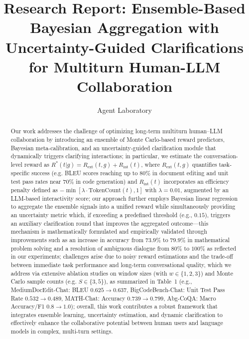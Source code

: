\documentclass{article} %
\title{Research Report: Ensemble-Based Bayesian Aggregation with Uncertainty-Guided Clarifications for Multiturn Human-LLM Collaboration}
\author{Agent Laboratory}
\date{}
\begin{document}
\maketitle

\begin{abstract}
Our work addresses the challenge of optimizing long-term multiturn human–LLM collaboration by introducing an ensemble of Monte Carlo-based reward predictors, Bayesian meta-calibration, and an uncertainty-guided clarification module that dynamically triggers clarifying interactions; in particular, we estimate the conversation-level reward as \(R^*(t|g) = R_{\text{ext}}(t,g) + R_{\text{int}}(t)\), where \(R_{\text{ext}}(t,g)\) quantifies task-specific success (e.g. BLEU scores reaching up to \(80\%\) in document editing and unit test pass rates near \(70\%\) in code generation) and \(R_{\text{int}}(t)\) incorporates an efficiency penalty defined as \(-\min[\lambda \cdot \text{TokenCount}(t), 1]\) with \(\lambda=0.01\), augmented by an LLM-based interactivity score; our approach further employs Bayesian linear regression to aggregate the ensemble signals into a unified reward while simultaneously providing an uncertainty metric which, if exceeding a predefined threshold (e.g., \(0.15\)), triggers an auxiliary clarification round that improves the aggregated outcome—this mechanism is mathematically formulated and empirically validated through improvements such as an increase in accuracy from \(73.9\%\) to \(79.9\%\) in mathematical problem solving and a resolution of ambiguous dialogue from \(80\%\) to \(100\%\) as reflected in our experiments; challenges arise due to noisy reward estimations and the trade-off between immediate task performance and long-term conversational quality, which we address via extensive ablation studies on window sizes (with \(w \in \{1,2,3\}\)) and Monte Carlo sample counts (e.g. \(S \in \{3,5\}\)), as summarized in Table~1 (e.g., MediumDocEdit-Chat: BLEU \(0.625 \rightarrow 0.637\), BigCodeBench-Chat: Unit Test Pass Rate \(0.532 \rightarrow 0.489\), MATH-Chat: Accuracy \(0.739 \rightarrow 0.799\), Abg-CoQA: Macro Accuracy/F1 \(0.8 \rightarrow 1.0\)); overall, this work contributes a robust framework that integrates ensemble learning, uncertainty estimation, and dynamic clarification to effectively enhance the collaborative potential between human users and language models in complex, multi-turn settings.
\end{abstract}
\end{document}
